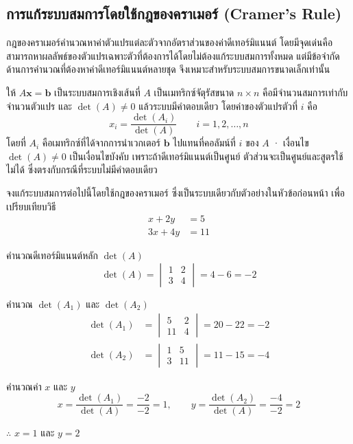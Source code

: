 \subsection{การแก้ระบบสมการโดยใช้กฎของคราเมอร์ (Cramer's Rule)}
\label{ssec:cramers-rule}
กฎของคราเมอร์คำนวณหาค่าตัวแปรแต่ละตัวจากอัตราส่วนของค่าดีเทอร์มิแนนต์ โดยมีจุดเด่นคือสามารถหาผลลัพธ์ของตัวแปรเฉพาะตัวที่ต้องการได้โดยไม่ต้องแก้ระบบสมการทั้งหมด แต่มีข้อจำกัดด้านการคำนวณที่ต้องหาค่าดีเทอร์มิแนนต์หลายชุด จึงเหมาะสำหรับระบบสมการขนาดเล็กเท่านั้น~\parencite{lay2021linear}

\begin{prop}[กฎของคราเมอร์]
\label{prop:cramers-rule}
ให้ $A\mathbf{x} = \mathbf{b}$ เป็นระบบสมการเชิงเส้นที่ $A$ เป็นเมทริกซ์จัตุรัสขนาด $n \times n$ คือมีจำนวนสมการเท่ากับจำนวนตัวแปร และ $\det(A) \neq 0$ แล้วระบบมีคำตอบเดียว โดยค่าของตัวแปรตัวที่ $i$ คือ
\[ x_i = \frac{\det(A_i)}{\det(A)} \qquad i = 1, 2, \ldots, n \]
โดยที่ $A_i$ คือเมทริกซ์ที่ได้จากการนำเวกเตอร์ $\mathbf{b}$ ไปแทนที่คอลัมน์ที่ $i$ ของ $A$ · เงื่อนไข $\det(A) \neq 0$ เป็นเงื่อนไขบังคับ เพราะถ้าดีเทอร์มิแนนต์เป็นศูนย์ ตัวส่วนจะเป็นศูนย์และสูตรใช้ไม่ได้ ซึ่งตรงกับกรณีที่ระบบไม่มีคำตอบเดียว
\end{prop}

\begin{ex}
\label{ex:cramer-2x2}
จงแก้ระบบสมการต่อไปนี้โดยใช้กฎของคราเมอร์ ซึ่งเป็นระบบเดียวกับตัวอย่างในหัวข้อก่อนหน้า เพื่อเปรียบเทียบวิธี
\[
\begin{aligned}
x + 2y &= 5 \\
3x + 4y &= 11
\end{aligned}
\]
\end{ex}
\begin{solution}
คำนวณดีเทอร์มิแนนต์หลัก $\det(A)$ \[ \det(A) = \begin{vmatrix} 1 & 2 \\ 3 & 4 \end{vmatrix} = 4 - 6 = -2 \]

คำนวณ $\det(A_1)$ และ $\det(A_2)$ \begin{align*}
    \det(A_1) &= \begin{vmatrix} 5 & 2 \\ 11 & 4 \end{vmatrix} = 20 - 22 = -2\\
    \det(A_2) &= \begin{vmatrix} 1 & 5 \\ 3 & 11 \end{vmatrix} = 11 - 15 = -4
    \end{align*}

คำนวณค่า $x$ และ $y$ \[ x = \frac{\det(A_1)}{\det(A)} = \frac{-2}{-2} = 1, \qquad y = \frac{\det(A_2)}{\det(A)} = \frac{-4}{-2} = 2 \]

$\therefore$ $x = 1$ และ $y = 2$ \solhere
\end{solution}

